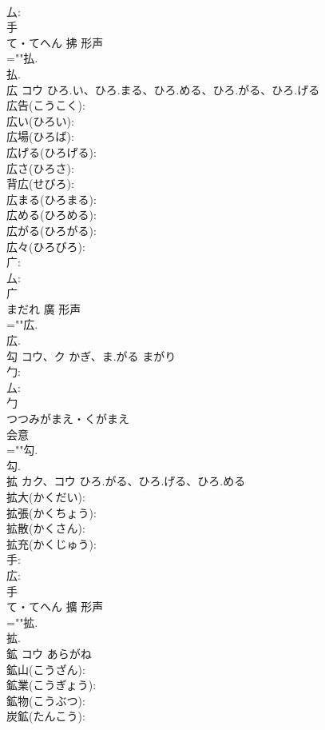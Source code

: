 \documentclass[8pt]{extreport}
\begin{document}
\begin{CJK}{UTF8}{min}
\\	厶: 
\\	手	
\\	て・てへん	拂	形声 
\\	=""払.
\\	払.
\\	広	コウ	ひろ.い、ひろ.まる、ひろ.める、ひろ.がる、ひろ.げる		
\\	広告(こうこく): 
\\	広い(ひろい): 
\\	広場(ひろば): 
\\	広げる(ひろげる): 
\\	広さ(ひろさ): 
\\	背広(せびろ): 
\\	広まる(ひろまる): 
\\	広める(ひろめる): 
\\	広がる(ひろがる): 
\\	広々(ひろびろ): 
\\	广: 
\\	厶: 
\\	广	
\\	まだれ	廣	形声 
\\	=""広.
\\	広.
\\	勾	コウ、ク	かぎ、ま.がる	まがり	
\\	勹: 
\\	厶: 
\\	勹	
\\	つつみがまえ・くがまえ	
\\	会意 
\\	=""勾.
\\	勾.
\\	拡	カク、コウ	ひろ.がる、ひろ.げる、ひろ.める		
\\	拡大(かくだい): 
\\	拡張(かくちょう): 
\\	拡散(かくさん): 
\\	拡充(かくじゅう): 
\\	手: 
\\	広: 
\\	手	
\\	て・てへん	擴	形声 
\\	=""拡.
\\	拡.
\\	鉱	コウ	あらがね		
\\	鉱山(こうざん): 
\\	鉱業(こうぎょう): 
\\	鉱物(こうぶつ): 
\\	炭鉱(たんこう): 

\end{CJK}
\end{document}
